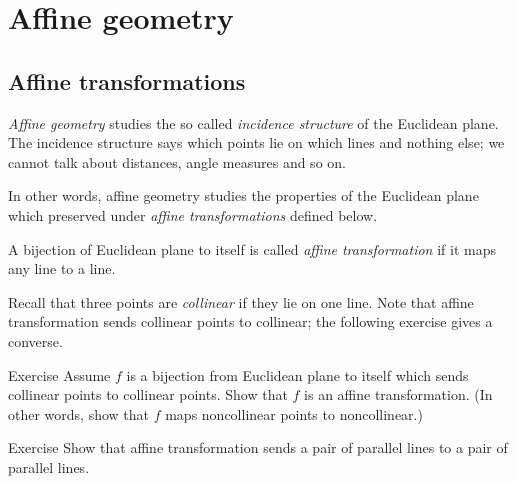 
\chapter{Affine geometry}\label{chap:trans}

\section*{Affine transformations}

\emph{Affine geometry} studies the so called \emph{incidence structure} of the Euclidean plane.
The incidence structure says which points lie on which lines and nothing else;
we cannot talk about distances, angle measures and so on.

In other words, affine geometry studies
the properties of the Euclidean plane which preserved under {}\emph{affine transformations} defined below.

A bijection of Euclidean plane to itself 
is called \emph{affine transformation}
if it maps any line to a line.

Recall that three points are \emph{collinear} if they lie on one line. 
Note that affine transformation sends collinear points to collinear; the following exercise gives a converse.

\begin{thm}{Exercise}\label{ex:collinear=affine}
Assume $f$ is a bijection from Euclidean plane to itself which sends collinear points to collinear points.
Show that $f$ is an affine transformation.
(In other words, show that $f$ maps noncollinear points to noncollinear.)
\end{thm}

\begin{thm}{Exercise}\label{ex:affine-par}
Show that affine transformation sends a pair of parallel lines to a pair of parallel lines.
\end{thm}

